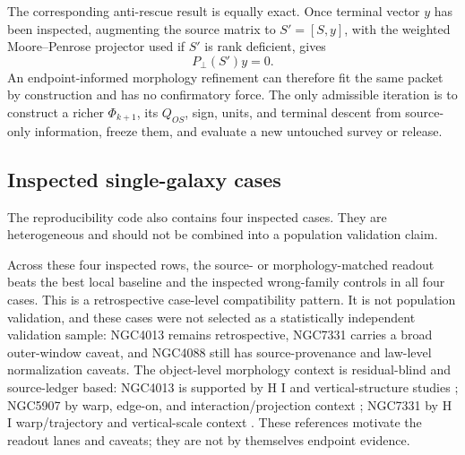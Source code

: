 \documentclass[11pt]{article}
\begin{document}
The corresponding anti-rescue result is equally exact.  Once terminal vector
\(y\) has been inspected, augmenting the source matrix to \(S'=[S,y]\), with
the weighted Moore--Penrose projector used if \(S'\) is rank deficient, gives
\begin{equation}
P_\perp(S')y=0.
\label{eq:post-open-saturation}
\end{equation}
An endpoint-informed morphology refinement can therefore fit the same packet
by construction and has no confirmatory force.  The only admissible iteration
is to construct a richer \(\Phi_{k+1}\), its \(Q_{OS}\), sign, units, and
terminal descent from source-only information, freeze them, and evaluate a new
untouched survey or release.

\subsection{Inspected single-galaxy cases}

The reproducibility code also contains four inspected cases.  They are heterogeneous and
should not be combined into a population validation claim.

\begin{table}[H]
\centering
\caption{Four inspected readout cases.  RMSE values are in
\({\rm km\,s^{-1}}\).}
\small
{}
\end{table}

Across these four inspected rows, the source- or morphology-matched readout
beats the best local baseline and the inspected wrong-family controls in all
four cases.  This is a retrospective case-level compatibility pattern.  It is not
population validation, and these cases were not selected as a statistically
independent validation sample: NGC4013 remains retrospective, NGC7331 carries a
broad outer-window caveat, and NGC4088 still has source-provenance and
law-level normalization caveats.
The object-level morphology context is residual-blind and source-ledger based:
NGC4013 is supported by H I and vertical-structure studies
\cite{ZschaechnerRand2015NGC4013HI,Comeron2011NGC4013Vertical};
NGC5907 by warp, edge-on, and interaction/projection context
\cite{Sasaki1987NGC5907Warp,Shang1998NGC5907Warp,Wiegert2015EdgeOnISM};
NGC7331 by H I warp/trajectory and vertical-scale context
\cite{Bosma1978NGC7331HI,Patra2018NGC7331ScaleHeight}.  These references
motivate the readout lanes and caveats; they are not by themselves endpoint
evidence.
\end{document}
